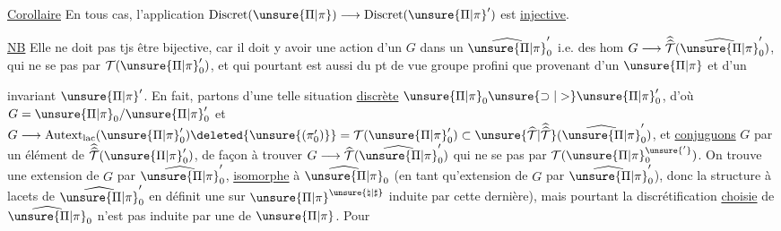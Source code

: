 \uline{Corollaire} En tous cas, l'application
\(\mathrm{Discret}(\unsure{\Pi|\pi})\longrightarrow\mathrm{Discret}(\unsure{\Pi|\pi}')\)
est \uline{injective}.

\uline{NB} Elle ne doit pas tjs être bijective,
car il doit y avoir une action  d'un
\(G\) dans un \(\widehat{\unsure{\Pi|\pi}}'_0\) i.e. des hom
\(G\longrightarrow\widehat{\widehat{\mathcal T}}(\widehat{\unsure{\Pi|\pi}}'_0)\), qui ne se  pas
par \(\mathcal T(\unsure{\Pi|\pi}'_0)\), et qui pourtant est aussi
 du pt de vue groupe profini que
 provenant d'un \(\unsure{\Pi|\pi}\) et d'un 


invariant $\unsure{\Pi|\pi}'$. En fait, partons d'une telle situation \uline{discrète} $\unsure{\Pi|\pi}_0 \unsure{\supset|>} \unsure{\Pi|\pi}'_0$, d'où $G=\unsure{\Pi|\pi}_0/\unsure{\Pi|\pi}'_0$ et $G\longrightarrow \operatorname{Autext}_{\mathrm{lac}}(\unsure{\Pi|\pi}'_0)\deleted{\unsure{(\pi'_0)}}=\mathcal T(\unsure{\Pi|\pi}'_0)\subset\unsure{\widehat{\mathcal T}|\widehat{\widehat{\mathcal T}}}(\widehat{\unsure{\Pi|\pi}}'_0)$, et \uline{conjuguons} $G$ par un élément \inserted{$\gamma$} de $\widehat{\widehat{\mathcal T}}(\unsure{\Pi|\pi}'_0)$, de façon à trouver $G\longrightarrow\widehat{\mathcal T}(\widehat{\unsure{\Pi|\pi}}'_0)$ qui ne  se  pas par $\mathcal T(\unsure{\Pi|\pi}^{\unsure{'}}_0)$. On trouve une extension \inserted{$\unsure{\widehat{\unsure{\Pi|\pi}}|\unsure{\Pi|\pi}}^{\unsure{\natural|\sharp}}$} de $G$ par $\widehat{\unsure{\Pi|\pi}}'_0$, \uline{isomorphe} à $\widehat{\unsure{\Pi|\pi}}_0$ (en tant qu'extension de $G$ par $\widehat{\unsure{\Pi|\pi}}'_0$), donc la structure à lacets de $\widehat{\unsure{\Pi|\pi}}'_0$ en définit une sur $\unsure{\Pi|\pi}^{\unsure{\natural|\sharp}}$   induite par cette dernière), mais pourtant la discrétification \uline{choisie}  de $\widehat{\unsure{\Pi|\pi}}_0$ n'est pas induite par une de $\unsure{\Pi|\pi}$. Pour

